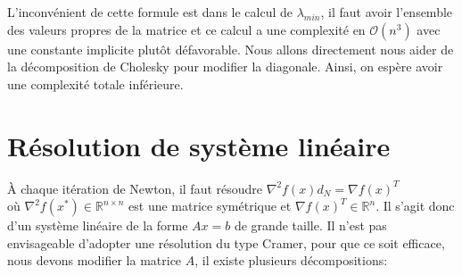 L'inconv\'enient de cette formule est dans le calcul de $\lambda_{min}$, il faut avoir l'ensemble des valeurs propres de
la matrice et ce calcul a une complexit\'e en $\mathcal{O}(n^3)$ avec une constante implicite plutôt d\'efavorable. 
Nous allons directement nous aider de la d\'ecomposition de Cholesky pour modifier la diagonale. Ainsi, on esp\`ere avoir
une complexit\'e totale inf\'erieure.





\section{R\'esolution de syst\`eme lin\'eaire}
\`A chaque it\'eration de Newton, il faut r\'esoudre $\nabla^2 f(x)d_N=\nabla f(x)^T$\\ o\`u $\nabla^2 f(x^*)\in \mathbb{R}^{n\times n}$
 est une matrice sym\'etrique et $\nabla f(x)^T \in \mathbb{R}^n$.
Il s'agit donc d'un syst\`eme lin\'eaire de la forme $Ax=b$ de grande taille. Il n'est pas envisageable 
d'adopter une r\'esolution du type Cramer, pour que ce soit efficace, nous devons
 modifier la matrice $A$, il existe plusieurs d\'ecompositions:
